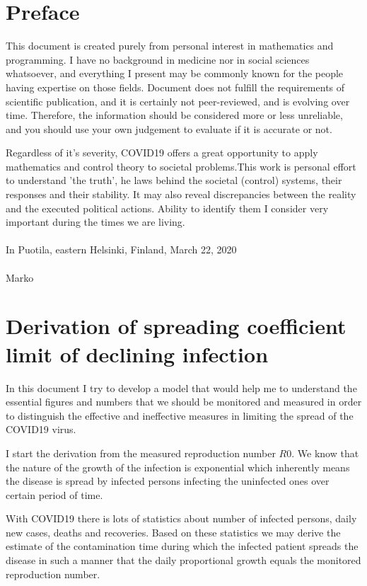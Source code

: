 \chapter{Preface}
This document is created purely from personal interest in mathematics and
programming. I have no background in medicine nor in social sciences
whatsoever, and everything I present may be commonly known for the people
having expertise on those fields. Document does not fulfill the requirements
of scientific publication, and it is certainly not peer-reviewed, and is
evolving over time. Therefore, the information should be considered more or
less unreliable, and you should use your own judgement to evaluate if it is
accurate or not. 

Regardless of it's
severity, COVID19 offers a great opportunity to apply mathematics and control
theory to societal problems.This work is personal effort to understand 'the
truth', he laws behind the societal (control) systems, their responses and
their stability.  It may also reveal discrepancies between the reality and the
executed political actions. Ability to identify them I consider very important
during the times we are living.
\\
\\
In Puotila, eastern Helsinki, Finland, March 22, 2020\\
\\
Marko


\chapter{Derivation of spreading coefficient limit of declining infection}\label{chap:principles}

In this document I try to develop a model that would help me to understand the
essential figures and numbers that we should be monitored and measured in order to 
distinguish the effective and ineffective measures in limiting the spread of
the COVID19 virus.

I start the derivation from the measured reproduction number $R0$. We know that
the nature of the growth of the infection is exponential which inherently
means the disease is spread by infected persons infecting the uninfected ones
over certain period of time.

With COVID19 there is lots of statistics about number of
infected persons, daily new cases, deaths and recoveries. Based on these
statistics we may derive the estimate of the contamination time during which
the infected patient spreads the disease in such a manner that the daily
proportional growth equals the monitored reproduction number.

